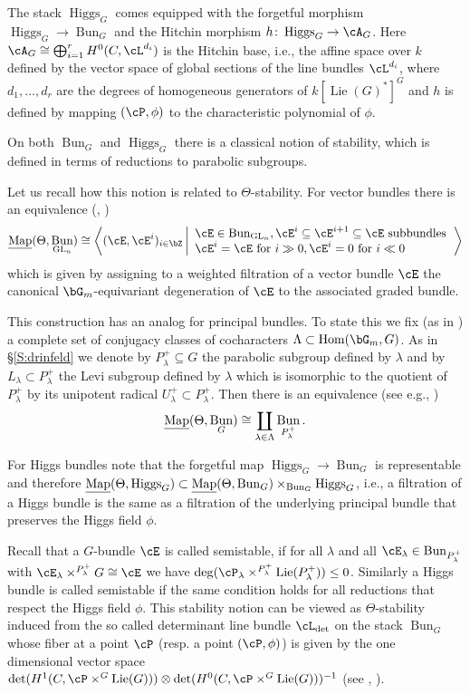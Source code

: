\documentclass[a4paper]{amsart}
\numberwithin{equation}{section}
\theoremstyle{plain}
\theoremstyle{definition}
\DeclareMathOperator{\GL}{GL}
\DeclareMathOperator{\Hom}{Hom}
\DeclareMathOperator{\Bun}{Bun}
\newcommand{\uMap}{\underline{{\rm Map}}}
\newcommand{\co}{\colon}
\newcommand{\tensor}{\otimes}
\DeclareMathOperator{\Lie}{Lie}
\DeclareMathOperator{\Higgs}{Higgs}
\begin{document}
The stack $\Higgs_G$ comes equipped with the forgetful morphism $\Higgs_G \to \Bun_G$ and the Hitchin morphism $h \co \Higgs_G \to \cA_G$. Here $\cA_G\cong \bigoplus_{i=1}^r H^0(C,\cL^{d_i})$ {is the Hitchin base, i.e., the affine space over $k$ defined by the vector space of global sections of the line bundles $\cL^{d_i}$}, where $d_1,\dots,d_r$ are the degrees of homogeneous generators of $k[\Lie(G)^\ast]^G$ and $h$ is defined by mapping $(\cP,\phi)$ to the characteristic polynomial of $\phi$.  

On both $\Bun_G$ and $\Higgs_G$ there is a classical notion of stability, which is defined in terms of reductions to parabolic subgroups. 

Let us recall how this notion is related to $\Theta$-stability. For vector bundles there is an equivalence (, \cite[Lem.~1.10]{heinloth-stability})
$$ \uMap(\Theta,\Bun_{\GL_n}) \cong  \left\langle (\cE,\cE^i)_{i\in \bZ} \left| \begin{array}{l} \cE \in \Bun_{\GL_n}, \cE^i\subseteq \cE^{i+1} \subseteq \cE \text{ subbundles} \\
\cE^i = \cE \text{ for } i\gg 0, \cE^i = 0 \text{ for } i\ll 0
\end{array}  \right.\right\rangle$$
which is given by assigning to a weighted filtration of a vector bundle $\cE$ the canonical $\bG_m$-equivariant degeneration of $\cE$ to the associated graded bundle. 

This construction has an analog for principal bundles. To state this we fix (as in ) a complete set of conjugacy classes of cocharacters $\Lambda \subset \Hom(\bG_m,G)$. As in \S \ref{S:drinfeld} we denote by $P_\lambda^+\subseteq G$ the parabolic subgroup defined by $\lambda$ and by $L_\lambda \subset P_\lambda^+$ the Levi subgroup defined by $\lambda$ which is isomorphic to the quotient of $P_\lambda^+$ by its unipotent radical $U_\lambda^+ \subset P_\lambda^+$. Then there is an equivalence (see e.g., \cite[Lem.~1.13]{heinloth-stability}) 
$$ \uMap(\Theta, \Bun_G)  \cong  \coprod_{\lambda \in \Lambda} \Bun_{P_\lambda^+}.$$

For Higgs bundles note that the forgetful map $\Higgs_G\to \Bun_G$ is representable and therefore $\uMap(\Theta,\Higgs_G) \subset \uMap(\Theta,\Bun_G)\times_{\Bun_G}\Higgs_G$, i.e., a filtration of a Higgs bundle is the same as a filtration of the underlying principal bundle that preserves the Higgs field $\phi$. 

Recall that a $G$-bundle $\cE$ is called semistable, if for all $\lambda$ and all $\cE_\lambda \in  \Bun_{P_\lambda^+}$ with $\cE_\lambda\times^{P_\lambda^+}G \cong \cE$ we have $\deg(\cP_\lambda\times^{P_\lambda^+} \Lie(P_\lambda^+)) \leq 0$.  Similarly a Higgs bundle is called semistable if the same condition holds for all reductions that respect the Higgs field $\phi$. This stability notion can be viewed as $\Theta$-stability induced from the so called determinant line bundle $\cL_{\det}$ on the stack $\Bun_G$ whose fiber at a point $\cP$ (resp. a point $(\cP,\phi)$)  is given by the one dimensional vector space $\det(H^1(C,\cP\times^G \Lie(G))) \tensor \det(H^0(C,\cP\times^G \Lie(G)))^{-1}$ (see \cite[\S 1.F]{heinloth-stability}, \cite{hlinstability}).
\end{document}
